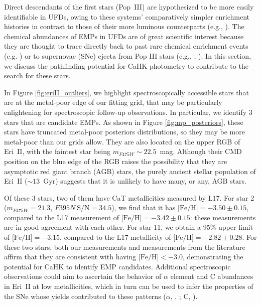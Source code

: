 \documentclass[twocolumn]{aastex63}
\begin{document}
\par Direct descendants of the first stars (Pop~III) are hypothesized to be more easily identifiable in UFDs, owing to these systems' comparatively simpler enrichment histories in contrast to those of their more luminous counterparts (e.g., \citealt{ji2015popIII}). The chemical abundances of EMPs in UFDs are of great scientific interest because they are thought to trace directly back to past rare chemical enrichment events (e.g. \citealt{ji2016rproc}) or to supernovae (SNe) ejecta from Pop III stars (e.g., \citealt{frebel2015nfcreview}, \citealt{jeon2017popIII}). In this section, we discuss the pathfinding potential for CaHK photometry to contribute to the search for these stars. 

\par In Figure \ref{fig:eriII_outliers}, we highlight spectroscopically accessible stars that are at the metal-poor edge of our fitting grid, that may be particularly enlightening for spectroscopic follow-up observations. In particular, we identify 3 stars that are candidate EMPs. As shown in Figure \ref{fig:mp_posteriors}, these stars have truncated metal-poor posteriors distributions, so they may be more metal-poor than our grids allow. They are also located on the upper RGB of Eri~II, with the faintest star being $m_{F475W}\sim22.5$~mag. Although their CMD position on the blue edge of the RGB raises the possibility that they are asymptotic red giant branch (AGB) stars, the purely ancient stellar population of Eri~II ($\sim13$~Gyr) suggests that it is unlikely to have many, or any, AGB stars.

\par Of these 3 stars, two of them have CaT metallicities measured by L17. For star 2 ($m_{F475W}=21.3$, $F395N~\mbox{S/N}=34.5$), we find that it has $\mbox{[Fe/H]}=-3.50\pm0.15$, compared to the L17 measurement of $\mbox{[Fe/H]}=-3.42\pm0.15$: these measurements are in good agreement with each other. For star 11, we obtain a 95\% upper limit of $\mbox{[Fe/H]}=-3.15$, compared to the L17 metallicity of $\mbox{[Fe/H]}=-2.82\pm0.28$. For these two stars, both our measurements and measurements from the literature affirm that they are consistent with having $\mbox{[Fe/H]}<-3.0$, demonstrating the potential for CaHK to identify EMP candidates. Additional spectroscopic observations could aim to ascertain the behavior of $\alpha$ element and C abundances in Eri~II at low metallicities, which in turn can be used to infer the properties of the SNe whose yields contributed to these patterns ($\alpha$, \citealt{nagasawa2018horI}, \citealt{ji2020carinas}; C, \citealt{jeon2021cemp}).
\end{document}
